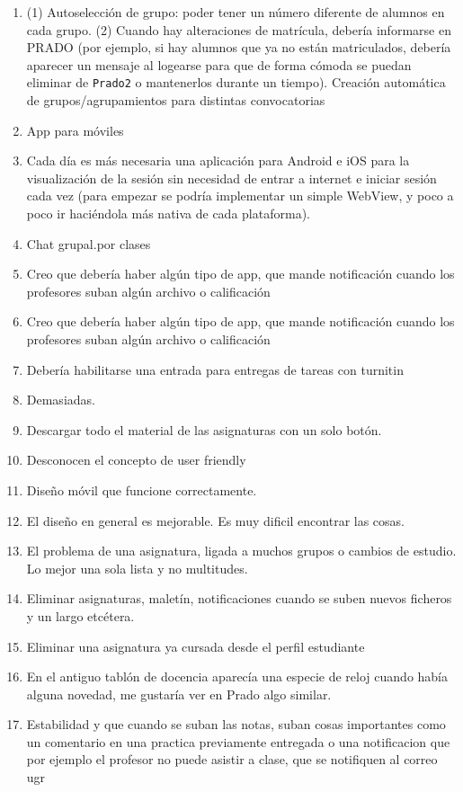 \begin{enumerate}
\item (1) Autoselección de grupo: poder tener un número diferente de alumnos en cada grupo. (2) Cuando hay alteraciones de matrícula, debería informarse en PRADO (por ejemplo, si hay alumnos que ya no están matriculados, debería aparecer un mensaje al logearse para que de forma cómoda se puedan eliminar de \texttt{Prado2} o mantenerlos durante un tiempo). Creación automática de grupos/agrupamientos para distintas convocatorias
\item App para móviles
\item Cada día es más necesaria una aplicación para Android e iOS para la visualización de la sesión sin necesidad de entrar a internet e iniciar sesión cada vez (para empezar se podría implementar un simple WebView, y poco a poco ir haciéndola más nativa de cada plataforma).
\item Chat grupal.por clases
\item Creo que debería haber algún tipo de app, que mande notificación cuando los profesores suban algún archivo o calificación
\item Creo que debería haber algún tipo de app, que mande notificación cuando los profesores suban algún archivo o calificación
\item Debería habilitarse una entrada para entregas de tareas con turnitin
\item Demasiadas.
\item Descargar todo el material de las asignaturas con un solo botón.
\item Desconocen el concepto de user friendly
\item Diseño móvil que funcione correctamente.
\item El diseño en general es mejorable. Es muy dificil encontrar las cosas.
\item El problema de una asignatura, ligada a muchos grupos o cambios de estudio. Lo mejor una sola lista y no multitudes.
\item Eliminar asignaturas, maletín, notificaciones cuando se suben nuevos ficheros y un largo etcétera.
\item Eliminar una asignatura ya cursada desde el perfil estudiante
\item En el antiguo tablón de docencia aparecía una especie de reloj cuando había alguna novedad, me gustaría ver en Prado algo similar.
\item Estabilidad y que cuando se suban las notas, suban cosas importantes como un comentario en una practica previamente entregada o una notificacion que por ejemplo el profesor no puede asistir a clase, que se notifiquen al correo ugr

\end{enumerate}
